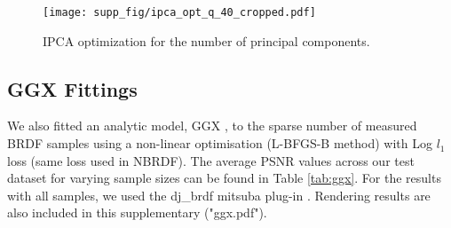 \begin{figure}[h]
  \centering

  {\texttt{[image: supp\_fig/ipca\_opt\_q\_40\_cropped.pdf]}}
   \caption{IPCA optimization for the number of principal components.}
   \label{fig:ipca_opt}
\end{figure}

\begin{table*}
    \centering
    \caption{Average Mean squared errors for varying latent space dimensions (first row) and number of principal components (second row)}

    \label{table: z_abl}
\end{table*}

\subsection{GGX Fittings}
We also fitted an analytic model, GGX \cite{walter2007microfacet}, to the sparse number of measured BRDF samples using a non-linear optimisation (L-BFGS-B method) with Log $l_1$ loss (same loss used in NBRDF). The average PSNR values across our test dataset for varying sample sizes can be found in Table \ref{tab:ggx}. For the results with all samples, we used the dj\_brdf mitsuba plug-in \cite{dupuy2015photorealistic}. Rendering results are also included in this supplementary ("ggx.pdf").


